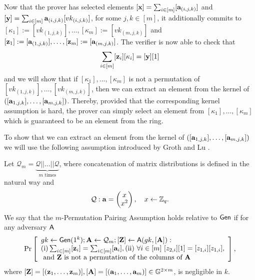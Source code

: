 Now that the prover has selected elements $[\mathbf{x}]=\sum_{i\in[m]}[\mathbf{a}_{(i,j,k)}]$ and $[\mathbf{y}]=\sum_{i\in[m]}\mathbf{a}_{(i,j,k)}[vk_{(i,j,k)}]$, for some $j,k\in[m]$, it additionally commits to $[\kappa_1]:=[vk_{(1,j,k)}],\ldots,\allowbreak[\kappa_m]:=[vk_{(m,j,k)}]$ and $[\mathbf{z}_1]:=[\mathbf{a}_{(1,j,k)}],\ldots,[\mathbf{z}_m]:=[\mathbf{a}_{(m,j,k)}]$. The verifier is now able to check that
\begin{equation}
\sum_{i\in[m]}[\mathbf{z}_i][\kappa_i]=[\mathbf{y}][1] \label{eq:verif1}
\end{equation}
and we will show that if $[\kappa_1],\ldots,[\kappa_m]$ is not a permutation of $[vk_{(1,j,k)}],\ldots,\allowbreak[vk_{(m,j,k)}]$, then we can extract an element from the kernel of $([\mathbf{a}_{1,j,k}],\ldots,[\mathbf{a}_{m,j,k}])$. Thereby, provided that the corresponding kernel assumption is hard, the prover can simply select an element from $[\kappa_1],\ldots,[\kappa_m]$ which is guaranteed to be an element from the ring.

To show that we can extract an element from the kernel of $([\mathbf{a}_{1,j,k}],\ldots,[\mathbf{a}_{m,j,k}])$ we will use the following assumption introduced by Groth and Lu \cite{AC:GroLu07}.
\begin{definition}
Let $\mathcal{Q}_{m}=\underbrace{\mathcal{Q}||\ldots||\mathcal{Q}}_{m\text{ times}}$, where concatenation of matrix distributions is defined in the natural way and 
$$\mathcal{Q}: \mathbf{a}=\left(\begin{matrix}x\\x^2\end{matrix}\right),\quad x\gets\mathbb{Z}_q.$$
We say that the $m$-Permutation Pairing Assumption holds relative to $\mathsf{Gen}$ if for any adversary $\mathsf{A}$
$$
\Pr\left[
\begin{array}{l}
gk\gets\mathsf{Gen}(1^k);\mathbf{{A}}\gets\mathcal{Q}_{m};[\mathbf{{Z}}]\gets\mathsf{A}(gk,[\mathbf{{A}}]):\\
\mathrm{(i)} \sum_{i\in[m]}[\mathbf{z}_i]=\sum_{i\in[m]}[\mathbf{a}_i], \mathrm{(ii)}\ \forall i\in[m]\ [z_{2,i}][1]=[z_{1,i}][z_{1,i}],\\
\text{ and }\mathbf{{Z}}\text{ is not a permutation of the columns of }\mathbf{{A}}
\end{array}
\right],
$$
where $[\mathbf{{Z}}]=[(\mathbf{z}_1,\ldots,\mathbf{z}_m)],[\mathbf{A}]=[(\mathbf{a}_1,\ldots,\mathbf{a}_m)]\in\mathbb{G}^{2\times m}$,
is negligible in $k$.
\end{definition}


